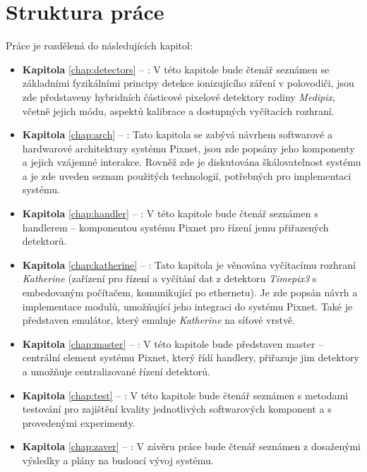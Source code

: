\section{Struktura práce}
Práce je rozdělená do následujících kapitol:
\begin{itemize}
    
    \item \textbf{Kapitola} \ref{chap:detectors} -- : V této kapitole bude čtenář seznámen se základními fyzikálními principy detekce ionizujícího záření v polovodiči, jsou zde představeny hybridních částicové pixelové detektory rodiny \textit{Medipix}, včetně jejich módu, aspektů kalibrace a dostupných vyčítacích rozhraní.
    
    \item \textbf{Kapitola} \ref{chap:arch} -- : Tato kapitola se zabývá návrhem softwarové a hardwarové architektury systému Pixnet, jsou zde popsány jeho komponenty a jejich vzájemné interakce. Rovněž zde je diskutována škálovatelnost systému a je zde uveden seznam použitých technologií, potřebných pro implementaci systému.
    
    \item \textbf{Kapitola} \ref{chap:handler} -- : V této kapitole bude čtenář seznámen s handlerem -- komponentou systému Pixnet pro řízení jemu přiřazených detektorů.
    
    \item \textbf{Kapitola} \ref{chap:katherine} -- : Tato kapitola je věnována vyčítacímu rozhraní \textit{Katherine} (zařízení pro řízení a vyčítání dat z detektoru \textit{Timepix3} s embedovaným počítačem, komunikující po ethernetu). Je zde popsán návrh a implementace modulů, umožňující jeho integraci do systému Pixnet. Také je představen emulátor, který emuluje \textit{Katherine} na síťové vrstvě.
    
    \item \textbf{Kapitola} \ref{chap:master} -- : V této kapitole bude představen master -- centrální element systému Pixnet, který řídí handlery, přiřazuje jim detektory a umožňuje centralizované řízení detektorů.
    
    \item \textbf{Kapitola} \ref{chap:test} -- : V této kapitole bude čtenář seznámen s metodami testování pro zajištění kvality jednotlivých softwarových komponent a s provedenými experimenty.
    
    \item \textbf{Kapitola} \ref{chap:zaver} -- : V závěru práce bude čtenář seznámen z dosaženými výsledky a plány na budoucí vývoj systému.

\end{itemize}